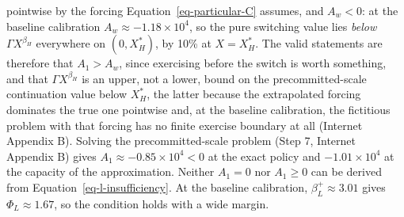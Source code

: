 \documentclass[
  11pt,
  letterpaper,
]{scrartcl}
\begin{document}
pointwise by the forcing Equation~\ref{eq-particular-C} assumes, and
\(A_w < 0\): at the baseline calibration
\(A_w \approx -1.18 \times 10^4\), so the pure switching value lies
\emph{below} \(\Gamma X^{\beta_H}\) everywhere on \((0, X_H^*)\), by
10\% at \(X = X_H^*\). The valid statements are therefore that
\(A_1 > A_w\), since exercising before the switch is worth something,
and that \(\Gamma X^{\beta_H}\) is an upper, not a lower, bound on the
precommitted-scale continuation value below \(X_H^*\), the latter
because the extrapolated forcing dominates the true one pointwise and,
at the baseline calibration, the fictitious problem with that forcing
has no finite exercise boundary at all (Internet Appendix B). Solving
the precommitted-scale problem (Step 7, Internet Appendix B) gives
\(A_1 \approx -0.85 \times 10^4 < 0\) at the exact policy and
\(-1.01 \times 10^4\) at the capacity of the approximation. Neither
\(A_1 = 0\) nor \(A_1 \geq 0\) can be derived from
Equation~\ref{eq-l-insufficiency}. At the baseline calibration,
\(\beta_L^+ \approx 3.01\) gives \(\Phi_L \approx 1.67\), so the
condition holds with a wide margin.
\end{document}
